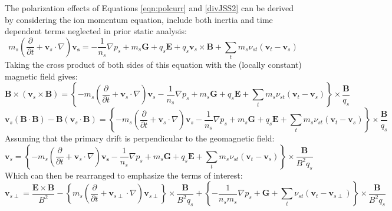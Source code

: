\documentclass[11pt,letterpaper]{article}
\begin{document}
The polarization effects of Equations \ref{eqn:polcurr} and \ref{divJSS2} can be derived by considering the ion momentum equation, include both inertia and time dependent terms neglected in prior static analysis:  
\begin{equation}
m_s \left( \frac{\partial }{\partial t}  + \mathbf{v}_s \cdot \nabla \right) \mathbf{v_s} = - \frac{1}{n_s} \nabla p_s + m_s \mathbf{G} +  q_s \mathbf{E} + q_s \mathbf{v}_s \times \mathbf{B} + \sum_t m_s \nu_{st} \left(\mathbf{v}_t - \mathbf{v}_s \right)
\end{equation}
Taking the cross product of both sides of this equation with the (locally constant) magnetic field gives:  
\begin{equation}
\mathbf{B} \times \left( \mathbf{v}_s \times \mathbf{B} \right) = \left\{ - m_s \left( \frac{\partial }{\partial t}  + \mathbf{v}_s \cdot \nabla \right) \mathbf{v}_s - \frac{1}{n_s} \nabla p_s + m_s \mathbf{G} +  q_s \mathbf{E} + \sum_t m_s \nu_{st} \left(\mathbf{v}_t - \mathbf{v}_s \right) \right \} \times \frac{\mathbf{B}}{q_s}
\end{equation}
\begin{equation}
\mathbf{v}_s (\mathbf{B} \cdot \mathbf{B}) - \mathbf{B}( \mathbf{v}_s \cdot \mathbf{B} ) = \left\{ - m_s \left( \frac{\partial }{\partial t}  + \mathbf{v}_s \cdot \nabla \right) \mathbf{v}_s - \frac{1}{n_s} \nabla p_s + m_s \mathbf{G} +  q_s \mathbf{E} + \sum_t m_s \nu_{st} \left(\mathbf{v}_t - \mathbf{v}_s \right) \right \} \times \frac{\mathbf{B}}{q_s}
\end{equation}
Assuming that the primary drift is perpendicular to the geomagnetic field:  
\begin{equation}
\mathbf{v}_s = \left\{ - m_s \left( \frac{\partial }{\partial t}  + \mathbf{v}_s \cdot \nabla \right) \mathbf{v_s} - \frac{1}{n_s} \nabla p_s + m_s \mathbf{G} +  q_s \mathbf{E} + \sum_t m_s \nu_{st} \left(\mathbf{v}_t - \mathbf{v}_s \right) \right \} \times \frac{\mathbf{B}}{B^2 q_s}
\end{equation}
Which can then be rearranged to emphasize the terms of interest:  
\begin{equation}
\mathbf{v}_{s\perp} = \frac{\mathbf{E} \times \mathbf{B}}{B^2} - \left\{ m_s \left( \frac{\partial }{\partial t}  + \mathbf{v}_{s\perp} \cdot \nabla \right) \mathbf{v}_{s\perp} \right\} \times \frac{\mathbf{B}}{B^2 q_s} + \left\{ - \frac{1}{n_s m_s} \nabla p_s + \mathbf{G} + \sum_t \nu_{st} \left(\mathbf{v}_t - \mathbf{v}_{s\perp} \right) \right \} \times \frac{\mathbf{B}}{B^2 q_s}
\end{equation}
\end{document}
